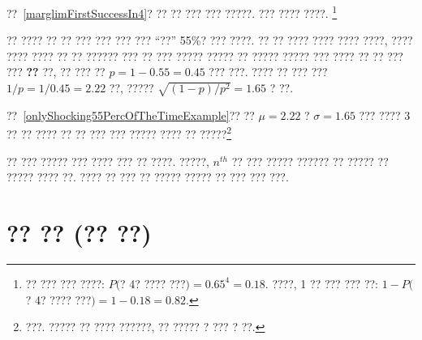 \begin{exercise}

??~\ref{marglimFirstSuccessIn4}? ?? ?? ??? ??? ?????. ??? ???? ????.
\footnote{?? ??? ??? ????: $P($? 4? ???? ???$) = 0.65^4 = 0.18$. ????, 1 ?? ??? ??? ??: $1-P($? 4? ???? ???$) = 1-0.18 = 0.82$.}
\end{exercise}

\begin{example}{?? ???? ?? ?? ??? ??? ??? ??? ``??'' 55\%? ??? ????. ?? ?? ???? ???? ???? ????, ???? ???? ???? ?? ?? ?????? ??? ?? ??? ????? ????? ?? ????? ?????} \label{onlyShocking55PercOfTheTimeExample}
??? ???? ?? ?? ??? ??? \textbf{??} ??, ?? ??? ?? $p=1-0.55=0.45$ ??? ???. ???? ?? ??? ??? $1/p = 1/0.45 = 2.22$ ??, ????? $\sqrt{(1-p)/p^2} = 1.65$ ? ??.
\end{example}

\begin{exercise}
??~\ref{onlyShocking55PercOfTheTimeExample}?? ?? $\mu = 2.22$ ? $\sigma = 1.65$ ??? ???? 3 ?? ?? ???? ?? ?? ??? ??? ????? ???? ?? ?????\footnote{???. ????? ?? ???? ??????, ?? ????? ? ??? ? ??.}
\end{exercise}

?? ??? ????? ??? ???? ??? ?? ????. ?????, $n^{th}$ ?? ??? ????? ?????? ?? ????? ?? ????? ???? ??. ???? ?? ??? ?? ????? ????? ?? ??? ??? ???.



\section{?? ?? (?? ??)}
\label{binomialModel}


